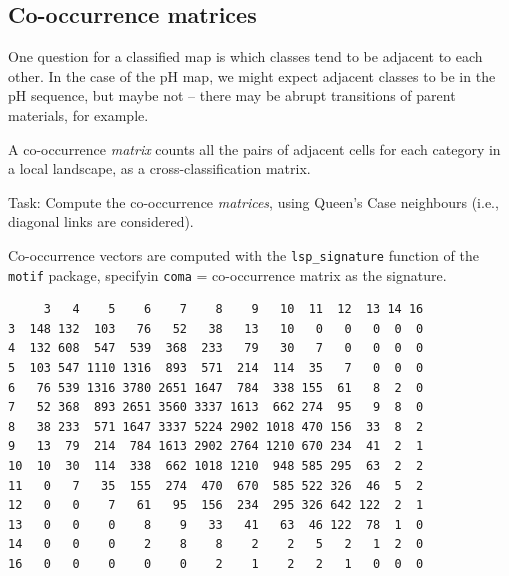 \documentclass[
  letterpaper,
  DIV=11,
  numbers=noendperiod]{scrartcl}
\newenvironment{Shaded}{\begin{snugshade}}{\end{snugshade}}
\newcommand{\AttributeTok}[1]{\textcolor[rgb]{0.40,0.45,0.13}{#1}}
\newcommand{\DecValTok}[1]{\textcolor[rgb]{0.68,0.00,0.00}{#1}}
\newcommand{\FunctionTok}[1]{\textcolor[rgb]{0.28,0.35,0.67}{#1}}
\newcommand{\NormalTok}[1]{\textcolor[rgb]{0.00,0.23,0.31}{#1}}
\newcommand{\OtherTok}[1]{\textcolor[rgb]{0.00,0.23,0.31}{#1}}
\newcommand{\SpecialCharTok}[1]{\textcolor[rgb]{0.37,0.37,0.37}{#1}}
\newcommand{\StringTok}[1]{\textcolor[rgb]{0.13,0.47,0.30}{#1}}
\begin{document}
\hypertarget{sec-coma}{%
\subsection{Co-occurrence matrices}\label{sec-coma}}

One question for a classified map is which classes tend to be adjacent
to each other. In the case of the pH map, we might expect adjacent
classes to be in the pH sequence, but maybe not -- there may be abrupt
transitions of parent materials, for example.

A co-occurrence \emph{matrix} counts all the pairs of adjacent cells for
each category in a local landscape, as a cross-classification matrix.

Task: Compute the co-occurrence \emph{matrices}, using Queen's Case
neighbours (i.e., diagonal links are considered).

Co-occurrence vectors are computed with the \texttt{lsp\_signature}
function of the \texttt{motif} package, specifyin \texttt{coma} =
co-occurrence matrix as the signature.

\begin{Shaded}
\end{Shaded}

\begin{verbatim}
     3   4    5    6    7    8    9   10  11  12  13 14 16
3  148 132  103   76   52   38   13   10   0   0   0  0  0
4  132 608  547  539  368  233   79   30   7   0   0  0  0
5  103 547 1110 1316  893  571  214  114  35   7   0  0  0
6   76 539 1316 3780 2651 1647  784  338 155  61   8  2  0
7   52 368  893 2651 3560 3337 1613  662 274  95   9  8  0
8   38 233  571 1647 3337 5224 2902 1018 470 156  33  8  2
9   13  79  214  784 1613 2902 2764 1210 670 234  41  2  1
10  10  30  114  338  662 1018 1210  948 585 295  63  2  2
11   0   7   35  155  274  470  670  585 522 326  46  5  2
12   0   0    7   61   95  156  234  295 326 642 122  2  1
13   0   0    0    8    9   33   41   63  46 122  78  1  0
14   0   0    0    2    8    8    2    2   5   2   1  2  0
16   0   0    0    0    0    2    1    2   2   1   0  0  0
\end{verbatim}
\end{document}
